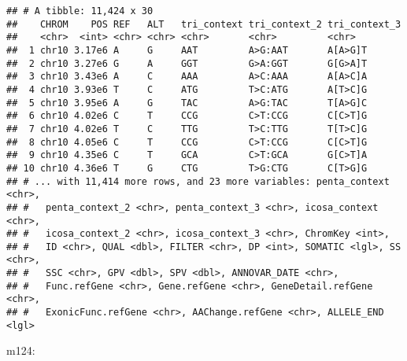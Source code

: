 \documentclass[]{article}
\begin{document}
\begin{verbatim}
## # A tibble: 11,424 x 30
##    CHROM    POS REF   ALT   tri_context tri_context_2 tri_context_3
##    <chr>  <int> <chr> <chr> <chr>       <chr>         <chr>        
##  1 chr10 3.17e6 A     G     AAT         A>G:AAT       A[A>G]T      
##  2 chr10 3.27e6 G     A     GGT         G>A:GGT       G[G>A]T      
##  3 chr10 3.43e6 A     C     AAA         A>C:AAA       A[A>C]A      
##  4 chr10 3.93e6 T     C     ATG         T>C:ATG       A[T>C]G      
##  5 chr10 3.95e6 A     G     TAC         A>G:TAC       T[A>G]C      
##  6 chr10 4.02e6 C     T     CCG         C>T:CCG       C[C>T]G      
##  7 chr10 4.02e6 T     C     TTG         T>C:TTG       T[T>C]G      
##  8 chr10 4.05e6 C     T     CCG         C>T:CCG       C[C>T]G      
##  9 chr10 4.35e6 C     T     GCA         C>T:GCA       G[C>T]A      
## 10 chr10 4.36e6 T     G     CTG         T>G:CTG       C[T>G]G      
## # ... with 11,414 more rows, and 23 more variables: penta_context <chr>,
## #   penta_context_2 <chr>, penta_context_3 <chr>, icosa_context <chr>,
## #   icosa_context_2 <chr>, icosa_context_3 <chr>, ChromKey <int>,
## #   ID <chr>, QUAL <dbl>, FILTER <chr>, DP <int>, SOMATIC <lgl>, SS <chr>,
## #   SSC <chr>, GPV <dbl>, SPV <dbl>, ANNOVAR_DATE <chr>,
## #   Func.refGene <chr>, Gene.refGene <chr>, GeneDetail.refGene <chr>,
## #   ExonicFunc.refGene <chr>, AAChange.refGene <chr>, ALLELE_END <lgl>
\end{verbatim}

m124:
\end{document}

